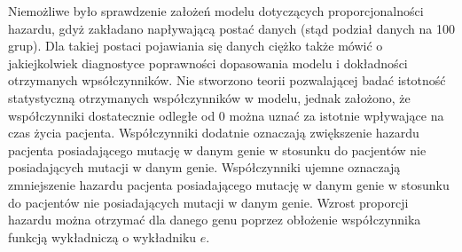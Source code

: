 \begin{Shaded}
\begin{Highlighting}[]
\NormalTok{coxData_split[}\NormalTok{:}\NormalTok{] ->}\StringTok{ }
\NormalTok{coxData_split[}\NormalTok{:}\NormalTok{] ->}\StringTok{ }
  \NormalTok{) ->}\StringTok{ }
  \NormalTok{) ->}\StringTok{ }
  \NormalTok{) ->}\StringTok{ }
  \NormalTok{,}
          \NormalTok{/(}\NormalTok{*}\StringTok{ }
  \NormalTok{,}
          \NormalTok{/(}\NormalTok{*}\StringTok{ }
  \NormalTok{,}
          \NormalTok{/(}\NormalTok{*}\StringTok{ }
\end{Highlighting}
\end{Shaded}

Niemożliwe było sprawdzenie założeń modelu dotyczących proporcjonalności
hazardu, gdyż zakładano napływającą postać danych (stąd podział danych
na 100 grup). Dla takiej postaci pojawiania się danych ciężko także
mówić o jakiejkolwiek diagnostyce poprawności dopasowania modelu i
dokładności otrzymanych wpsółczynników. Nie stworzono teorii
pozwalającej badać istotność statystyczną otrzymanych współczynników w
modelu, jednak założono, że współczynniki dostatecznie odległe od \(0\)
można uznać za istotnie wpływające na czas życia pacjenta. Współczynniki
dodatnie oznaczają zwiększenie hazardu pacjenta posiadającego mutację w
danym genie w stosunku do pacjentów nie posiadających mutacji w danym
genie. Współczynniki ujemne oznaczają zmniejszenie hazardu pacjenta
posiadającego mutację w danym genie w stosunku do pacjentów nie
posiadających mutacji w danym genie. Wzrost proporcji hazardu można
otrzymać dla danego genu poprzez obłożenie współczynnika funkcją
wykładniczą o wykładniku \(e\).

